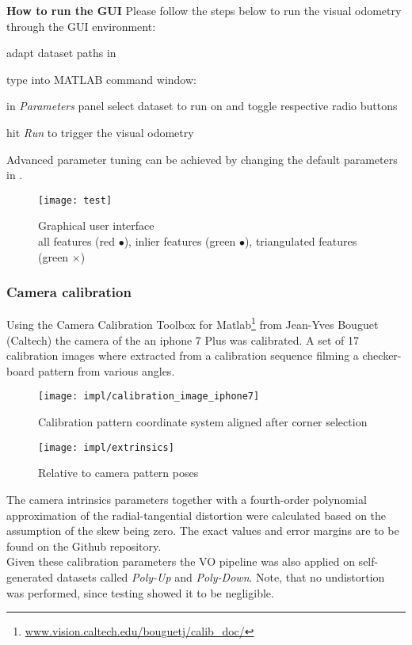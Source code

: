 \textbf{How to run the GUI}
Please follow the steps below to run the visual odometry through the GUI environment:
\begin{compactenum}
	\item adapt dataset paths in 
	\item type into MATLAB command window: 
	\item in \textit{Parameters} panel select dataset to run on and toggle respective radio buttons
	\item hit \textit{Run} to trigger the visual odometry\\
\end{compactenum}

Advanced parameter tuning can be achieved by changing the default parameters in .

\begin{figure}[ht]
	\centering
	\texttt{[image: test]}
	\captionsetup{justification=centering}
	\caption{Graphical user interface \\all features (red $\bullet$), inlier features (green $\bullet$), triangulated features (green $\times$)}
	\label{img_gui}
\end{figure}


\subsubsection{Camera calibration}
Using the Camera Calibration Toolbox for Matlab\footnote{\url{www.vision.caltech.edu/bouguetj/calib_doc/}} from Jean-Yves Bouguet (Caltech) the camera of the an iphone 7 Plus was calibrated. A set of 17 calibration images where extracted from a calibration sequence filming a checker-board pattern from various angles.

\begin{figure}[htbp]
	\centering
	\begin{minipage}{0.4\textwidth} 
		\centering
		\texttt{[image: impl/calibration\_image\_iphone7]}
		\caption{Calibration pattern coordinate system aligned after corner selection}
		\label{img_calib}
	\end{minipage}
	\begin{minipage}{0.4\textwidth}
		\centering
		\texttt{[image: impl/extrinsics]}
		\caption{Relative to camera pattern poses}
		\label{img_calib} 
	\end{minipage}
\end{figure}

The camera intrinsics parameters together with a fourth-order polynomial approximation of the radial-tangential distortion were calculated based on the assumption of the skew being zero. The exact values and error margins are to be found on the Github repository.\\

Given these calibration parameters the VO pipeline was also applied on self-generated datasets called \textit{Poly-Up} and \textit{Poly-Down}. Note, that no undistortion was performed, since testing showed it to be negligible.


\clearpage{\pagestyle{plain}\cleardoublepage}

\clearpage{\pagestyle{plain}\cleardoublepage}